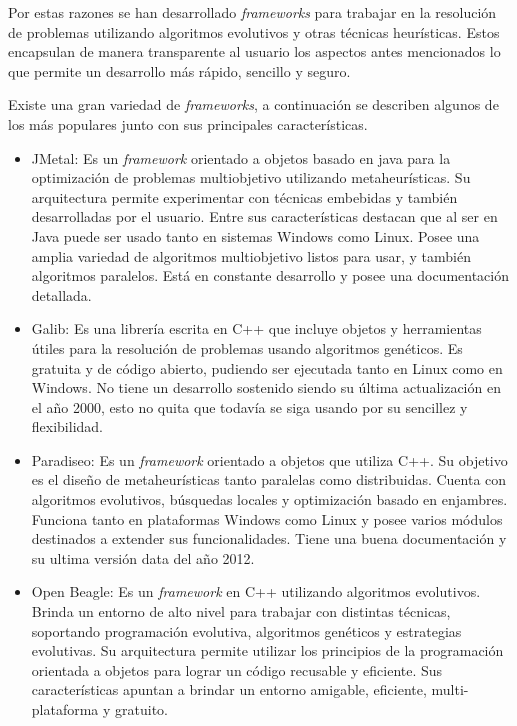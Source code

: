 Por estas razones se han desarrollado \emph{frameworks} para trabajar en la resolución de problemas utilizando algoritmos evolutivos y otras técnicas heurísticas. Estos encapsulan de manera transparente al usuario los aspectos antes mencionados lo que permite un desarrollo más rápido, sencillo y seguro.

Existe una gran variedad de \emph{frameworks}, a continuación se describen algunos de los más populares junto con sus principales características.

\begin{itemize}
	\item JMetal: Es un \emph{framework} orientado a objetos basado en java para la optimización de problemas multiobjetivo utilizando metaheurísticas. Su arquitectura permite experimentar con técnicas embebidas y también desarrolladas por el usuario. Entre sus características destacan que al ser en Java puede ser usado tanto en sistemas Windows como Linux. Posee una amplia variedad de algoritmos multiobjetivo listos para usar, y también algoritmos paralelos. Está en constante desarrollo y posee una documentación detallada. \citep{Jmetal}
	
	\item Galib: Es una librería escrita en C++ que incluye objetos y herramientas útiles para la resolución de problemas usando algoritmos genéticos. Es gratuita y de código abierto, pudiendo ser ejecutada tanto en Linux como en Windows. No tiene un desarrollo sostenido siendo su última actualización en el año 2000, esto no quita que todavía se siga usando por su sencillez y flexibilidad. \citep{Galib}
	
	\item Paradiseo: Es un \emph{framework} orientado a objetos que utiliza C++. Su objetivo es el diseño de metaheurísticas tanto paralelas como distribuidas. Cuenta con algoritmos evolutivos, búsquedas locales y optimización basado en enjambres. Funciona tanto en plataformas Windows como Linux y posee varios módulos destinados a extender sus funcionalidades. Tiene una buena documentación y su ultima versión data del año 2012. \citet{Paradiseo}
	
	\item Open Beagle: Es un \emph{framework} en C++ utilizando algoritmos evolutivos. Brinda un entorno de alto nivel para trabajar con distintas técnicas, soportando programación evolutiva, algoritmos genéticos y estrategias evolutivas. Su arquitectura permite utilizar los principios de la programación orientada a objetos para lograr un código recusable y eficiente. Sus características apuntan a brindar un entorno amigable, eficiente, multi-plataforma y gratuito. \citep{OpenBeagle}
	

\end{itemize}
